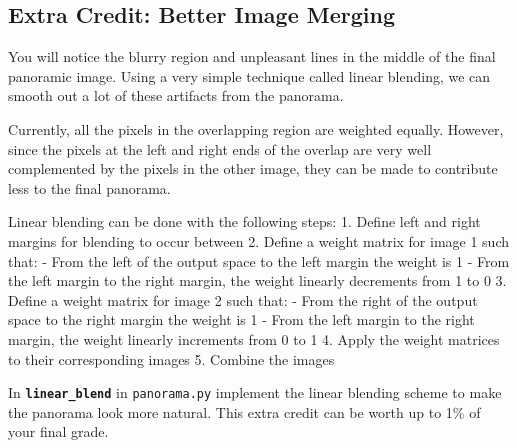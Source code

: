 \documentclass[11pt]{article}
\begin{document}
    \subsection{Extra Credit: Better Image
Merging}\label{extra-credit-better-image-merging}

You will notice the blurry region and unpleasant lines in the middle of
the final panoramic image. Using a very simple technique called linear
blending, we can smooth out a lot of these artifacts from the panorama.

Currently, all the pixels in the overlapping region are weighted
equally. However, since the pixels at the left and right ends of the
overlap are very well complemented by the pixels in the other image,
they can be made to contribute less to the final panorama.

Linear blending can be done with the following steps: 1. Define left and
right margins for blending to occur between 2. Define a weight matrix
for image 1 such that: - From the left of the output space to the left
margin the weight is 1 - From the left margin to the right margin, the
weight linearly decrements from 1 to 0 3. Define a weight matrix for
image 2 such that: - From the right of the output space to the right
margin the weight is 1 - From the left margin to the right margin, the
weight linearly increments from 0 to 1 4. Apply the weight matrices to
their corresponding images 5. Combine the images

In \textbf{\texttt{linear\_blend}} in \texttt{panorama.py} implement the
linear blending scheme to make the panorama look more natural. This
extra credit can be worth up to 1\% of your final grade.
\end{document}
